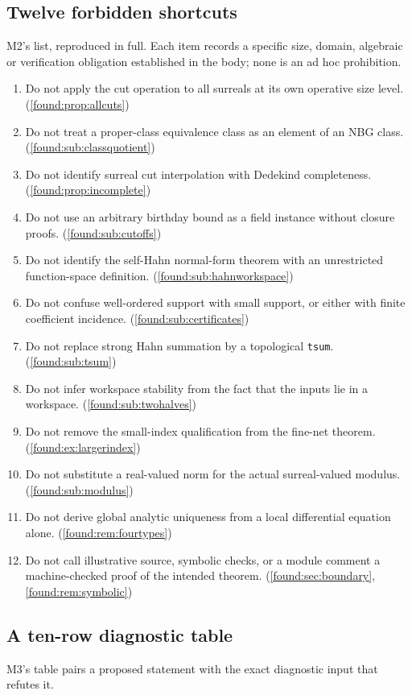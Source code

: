 \documentclass[11pt,letterpaper]{article}
\numberwithin{equation}{section}
\theoremstyle{definition}
\theoremstyle{remark}
\begin{document}
\subsection{Twelve forbidden shortcuts}
\label{found:app:twelve}
M2's list, reproduced in full. Each item records a specific size, domain,
algebraic or verification obligation established in the body; none is an ad hoc
prohibition.
\begin{enumerate}
\item Do not apply the cut operation to all surreals at its own operative size
level. (\cref{found:prop:allcuts})
\item Do not treat a proper-class equivalence class as an element of an NBG
class. (\cref{found:sub:classquotient})
\item Do not identify surreal cut interpolation with Dedekind completeness.
(\cref{found:prop:incomplete})
\item Do not use an arbitrary birthday bound as a field instance without closure
proofs. (\cref{found:sub:cutoffs})
\item Do not identify the self-Hahn normal-form theorem with an unrestricted
function-space definition. (\cref{found:sub:hahnworkspace})
\item Do not confuse well-ordered support with small support, or either with
finite coefficient incidence. (\cref{found:sub:certificates})
\item Do not replace strong Hahn summation by a topological \texttt{tsum}.
(\cref{found:sub:tsum})
\item Do not infer workspace stability from the fact that the inputs lie in a
workspace. (\cref{found:sub:twohalves})
\item Do not remove the small-index qualification from the fine-net theorem.
(\cref{found:ex:largerindex})
\item Do not substitute a real-valued norm for the actual surreal-valued
modulus. (\cref{found:sub:modulus})
\item Do not derive global analytic uniqueness from a local differential
equation alone. (\cref{found:rem:fourtypes})
\item Do not call illustrative source, symbolic checks, or a module comment a
machine-checked proof of the intended theorem.
(\cref{found:sec:boundary}, \cref{found:rem:symbolic})
\end{enumerate}

\subsection{A ten-row diagnostic table}
\label{found:app:regressiontable}
M3's table pairs a proposed statement with the exact diagnostic input that
refutes it.
\end{document}

